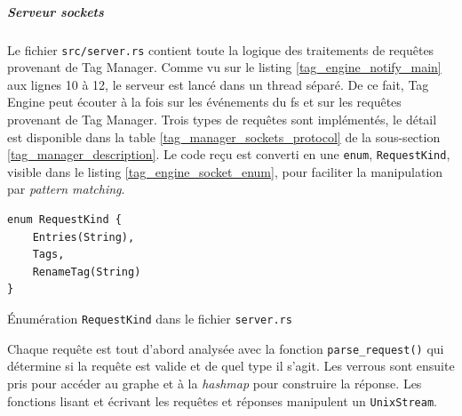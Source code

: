 \subparagraph{Serveur sockets}\label{tag_engine_socket}
Le fichier \texttt{src/server.rs} contient toute la logique des traitements de requêtes 
provenant de Tag Manager. Comme vu sur le listing \ref{tag_engine_notify_main} aux lignes 10 à 12, 
le serveur est lancé dans un thread séparé. De ce fait, Tag Engine peut écouter à la fois sur les 
événements du \acrshort{fs} et sur les requêtes provenant de Tag Manager. Trois types de requêtes 
sont implémentés, le détail est disponible dans la table \ref{tag_manager_sockets_protocol} de la 
sous-section \ref{tag_manager_description}. Le code reçu est converti en une \texttt{enum}, 
\texttt{RequestKind}, visible dans le listing \ref{tag_engine_socket_enum}, pour faciliter 
la manipulation par \textit{pattern matching}.
\bigbreak
\begin{code}
    \begin{verbatim}
enum RequestKind {
    Entries(String),
    Tags,
    RenameTag(String)
}
    \end{verbatim}
    \caption{Énumération \texttt{RequestKind} dans le fichier \texttt{server.rs}}
    \label{tag_engine_socket_enum}
\end{code}
\bigbreak
Chaque requête est tout d'abord analysée avec la 
fonction \texttt{parse_request()} qui détermine si la requête est valide et de quel type 
il s'agit. Les verrous sont ensuite pris pour accéder au graphe et à la \textit{hashmap} pour 
construire la réponse. Les fonctions lisant et écrivant les requêtes et réponses manipulent un 
\texttt{UnixStream}. 

